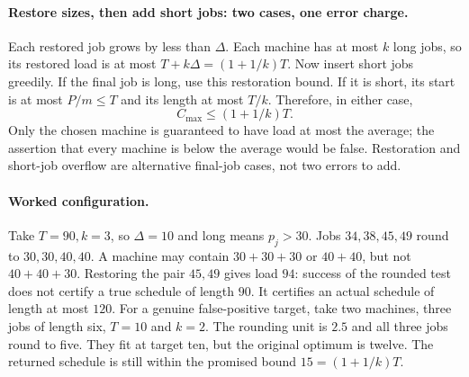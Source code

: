 \documentclass[11pt,a4paper]{article}
\newcommand{\1}{\mathbf 1}
\begin{document}
\paragraph{Restore sizes, then add short jobs: two cases, one error charge.}
Each restored job grows by less than $\Delta$. Each machine has at most $k$
long jobs, so its restored load is at most $T+k\Delta=(1+1/k)T$.
Now insert short jobs greedily. If the final job is long, use this restoration
bound. If it is short, its start is at most $P/m\leq T$ and its length at most
$T/k$. Therefore, in either case,
\[
 C_{\max}\leq(1+1/k)T.
\]
Only the chosen machine is guaranteed to have load at most the average;
the assertion that every machine is below the average would be false.
Restoration and short-job overflow are alternative final-job cases, not two errors to add.

\paragraph{Worked configuration.}
Take $T=90,k=3$, so $\Delta=10$ and long means $p_j>30$.
Jobs $34,38,45,49$ round to $30,30,40,40$. A machine may contain
$30+30+30$ or $40+40$, but not $40+40+30$. Restoring the pair $45,49$
gives load $94$: success of the rounded test does not certify a true schedule
of length $90$. It certifies an actual schedule of length at most $120$.
For a genuine false-positive target, take two machines, three jobs of length six,
$T=10$ and $k=2$. The rounding unit is $2.5$ and all three jobs round to five.
They fit at target ten, but the original optimum is twelve. The returned schedule
is still within the promised bound $15=(1+1/k)T$.
\end{document}
